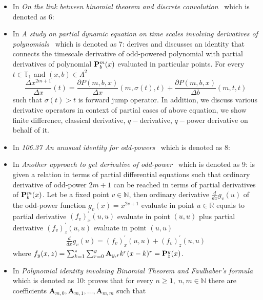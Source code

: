 \begin{itemize}
    \item In \textit{On the link between binomial theorem and discrete convolution}~\cite{kolosov2016link}
    which is denoted as 6:
    \item In \textit{A study on partial dynamic equation on time scales involving derivatives
    of polynomials}~\cite{kolosov2016study} which is denoted as 7:
    derives and discusses an identity that connects the timescale derivative of odd-powered polynomial
    with partial derivatives of polynomial ${\mathbf{P}}\sp{m} \sb{b}(x)$ evaluated in particular points.
    For every $t\in\mathbb{T}_1$ and $(x,b) \in \Lambda^2$
    \[
        \frac{\Delta x^{2m+1}}{\Delta x}(t) =
        \frac{\partial P(m,b,x)}{\Delta x} (m, \sigma(t), t) +
        \frac{\partial P(m,b,x)}{\Delta b} (m, t, t)
    \]
    such that $\sigma(t) > t$ is forward jump operator.
    In addition, we discuss various derivative operators in context of partial cases of above equation,
    we show finite difference, classical derivative, $q-$derivative, $q-$power derivative on behalf of it.
    \item In \textit{106.37 An unusual identity for odd-powers}~\cite{kolosov2022106} which is denoted as 8:
    \item In \textit{Another approach to get derivative of odd-power}~\cite{kolosov2023another} which is denoted as 9:
    is given a relation in terms of partial differential equations such that
    ordinary derivative of odd-power $2m+1$ can be reached in terms of partial derivatives of ${\mathbf{P}}\sp{m} \sb{b}(x)$.
    Let be a fixed point $v\in \mathbb{N}$, then ordinary derivative $\frac{d}{dx} g_v (u)$ of the odd-power function $g_v(x) = x^{2v + 1}$
    evaluate in point $u\in\mathbb{R}$ equals to partial derivative $(f_{v})^{'}_{x} (u, u)$ evaluate in point $(u, u)$ plus
    partial derivative $(f_{v})^{'}_{z} (u, u)$ evaluate in point $(u, u)$
    \begin{align*}
        \frac{d}{dx} g_v (u) = (f_{v})^{'}_{x} (u, u) + (f_{v})^{'}_{z} (u, u)
    \end{align*}
    where $f_{y} (x, z) = \sum_{k=1}^{z} \sum_{r=0}^{y} {\mathbf{A}} \sb{y,r} k^r (x-k)^r = {\mathbf{P}}\sp{y} \sb{z}(x)$.
    \item In \textit{Polynomial identity involving Binomial Theorem and Faulhaber's formula}~\cite{kolosov2023polynomial}
    which is denoted as 10: proves that
    for every $n\geq 1, \; n,m\in\mathbb{N}$
    there are coefficients $\mathbf{A}_{m,0}, \mathbf{A}_{m,1}, \ldots, \mathbf{A}_{m,m}$ such that

\end{itemize}
